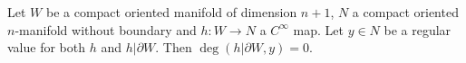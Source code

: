 Let $W$ be a compact oriented manifold of dimension $n + 1$, $N$ a compact oriented $n$-manifold without boundary and $h: W \to N$ a $C^\infty$ map. Let $y \in N$ be a regular value for both $h$ and $h|\partial W$. Then $\deg(h|\partial W, y) = 0$.
